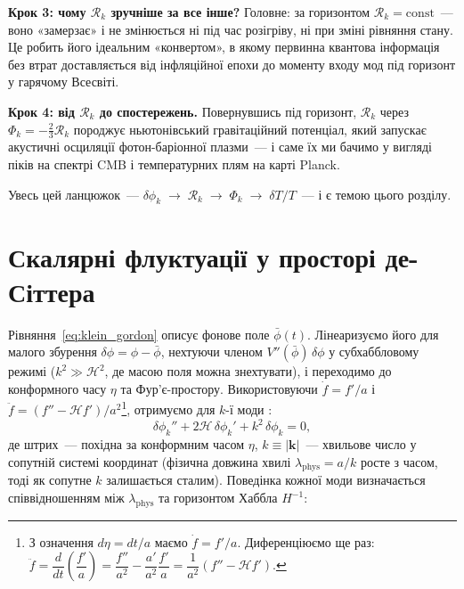 \medskip
\noindent\textbf{Крок 3: чому $\mathcal{R}_k$ зручніше за все інше?}
Головне: за горизонтом $\mathcal{R}_k = \mathrm{const}$~---
воно «замерзає» і не змінюється ні під час розігріву, ні при
зміні рівняння стану. Це робить його ідеальним «конвертом»,
в якому первинна квантова інформація без втрат доставляється
від інфляційної епохи до моменту входу мод під горизонт у
гарячому Всесвіті.

\medskip
\noindent\textbf{Крок 4: від $\mathcal{R}_k$ до спостережень.}
Повернувшись під горизонт, $\mathcal{R}_k$ через
$\Phi_k = -\frac{2}{3}\mathcal{R}_k$ породжує ньютонівський
гравітаційний потенціал, який запускає акустичні осциляції
фотон-баріонної плазми~--- і саме їх ми бачимо у вигляді
піків на спектрі CMB і температурних плям на карті Planck.

\medskip
\noindent Увесь цей ланцюжок~---
$\delta\phi_k \;\to\; \mathcal{R}_k \;\to\; \Phi_k \;\to\;
\delta T/T$~--- і є темою цього розділу.
\bigskip


\section{Скалярні флуктуації у просторі де-Сіттера}

Рівняння~\eqref{eq:klein_gordon} описує фонове поле $\bar{\phi}(t)$.
Лінеаризуємо його для малого збурення $\delta\phi = \phi - \bar{\phi}$,
нехтуючи членом $V''(\bar{\phi})\,\delta\phi$ у субхаббловому режимі
($k^2 \gg \mathcal{H}^2$, де масою поля можна знехтувати), і переходимо
до конформного часу $\eta$ та Фур'є-простору. Використовуючи
$\dot{f} = f'/a$ і $\ddot{f} = (f'' - \mathcal{H}f')/a^2$\footnote{%
З означення $d\eta = dt/a$ маємо $\dot{f} = f'/a$. Диференціюємо ще раз:
$\ddot{f} = \dfrac{d}{dt}\!\left(\dfrac{f'}{a}\right)
= \dfrac{f''}{a^2} - \dfrac{a'}{a^2}\dfrac{f'}{a}
= \dfrac{1}{a^2}(f'' - \mathcal{H}f')$.},
отримуємо для $k$-ї моди \cite{mukhanov_2005}:
\begin{equation}\label{eq:fourier_field}
  \delta\phi_k'' + 2\mathcal{H}\,\delta\phi_k' + k^2\,\delta\phi_k = 0,
\end{equation}
де штрих~--- похідна за конформним часом $\eta$, $k \equiv |\mathbf{k}|$~---
хвильове число у сопутній системі координат (фізична довжина хвилі
$\lambda_\mathrm{phys} = a/k$ росте з часом, тоді як сопутне $k$ залишається сталим).
Поведінка кожної моди визначається співвідношенням між $\lambda_\mathrm{phys}$
та горизонтом Хаббла $H^{-1}$:

